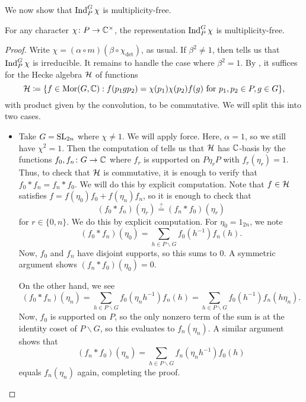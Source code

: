 We now show that $\operatorname{Ind}_P^G\chi$ is multiplicity-free.
\begin{proposition} \label{prop:ind-mult-free}
    For any character $\chi\colon P\to\mathbb C^\times$, the representation $\operatorname{Ind}_P^G\chi$ is multiplicity-free.
\end{proposition}
\begin{proof}
    Write $\chi=(\alpha\circ m)(\beta\circ\chi_{\det})$, as usual. If $\beta^2\ne1$, then  tells us that $\operatorname{Ind}_P^G\chi$ is irreducible. It remains to handle the case where $\beta^2=1$. By \cite[Theorem~45.1]{bump-lie-group}, it suffices for the Hecke algebra $\mathcal{H}$ of functions
    \[\mathcal{H}\coloneqq\{f\in\operatorname{Mor}(G,\mathbb C):f(p_1gp_2)=\chi(p_1)\chi(p_2)f(g)\text{ for }p_1,p_2\in P,g\in G\},\]
    with product given by the convolution, to be commutative. We will split this into two cases.
    \begin{itemize}
        \item Take $G=\mathrm{SL}_{2n}$ where $\chi\ne1$. We will apply force. Here, $\alpha=1$, so we still have $\chi^2=1$. Then the computation of  tells us that $\mathcal{H}$ has $\mathbb C$-basis by the functions $f_0,f_n\colon G\to\mathbb C$ where $f_r$ is supported on $P\eta_rP$ with $f_r(\eta_r)=1$. Thus, to check that $\mathcal{H}$ is commutative, it is enough to verify that $f_0*f_n=f_n*f_0$. We will do this by explicit computation. Note that $f\in\mathcal{H}$ satisfies $f=f(\eta_0)f_0+f(\eta_n)f_n$, so it is enough to check that
        \[(f_0*f_n)(\eta_r)\stackrel?=(f_n*f_0)(\eta_r)\]
        for $r\in\{0,n\}$. We do this by explicit computation. For $\eta_0=1_{2n}$, we note
        \[(f_0*f_n)(\eta_0)=\sum_{h\in P\backslash G}f_0\left(h^{-1}\right)f_n(h).\]
        Now, $f_0$ and $f_n$ have disjoint supports, so this sums to $0$. A symmetric argument shows $(f_n*f_0)(\eta_0)=0$.
        
        On the other hand, we see
        \[(f_0*f_n)(\eta_n)=\sum_{h\in P\backslash G}f_0\left(\eta_nh^{-1}\right)f_n(h)=\sum_{h\in P\backslash G}f_0\left(h^{-1}\right)f_n(h\eta_n).\]
        Now, $f_0$ is supported on $P$, so the only nonzero term of the sum is at the identity coset of $P\backslash G$, so this evaluates to $f_n(\eta_n)$. A similar argument shows that
        \[(f_n*f_0)(\eta_n)=\sum_{h\in P\backslash G}f_n\left(\eta_nh^{-1}\right)f_0(h)\]
        equals $f_n(\eta_n)$ again, completing the proof.
        

\end{itemize}
\end{proof}
